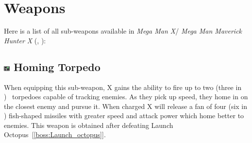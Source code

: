 \section{Weapons}\label{X1:sub_weapon}
Here is a list of all sub-weapons available in\textit{ Mega Man X}/ \textit{Mega Man Maverick Hunter X} (\cite{MHX:manual}, \cite{wiki:X_weapons}):

\subsection{\includegraphics[width=12px, height=10px]{figures/X1/weapons/Homig_T.jpg} Homing Torpedo}\label{Homing_torpedo}
When equipping this sub-weapon, X gains the ability to fire up to two (three in \mhx)~\cite{wiki:Homing_torpedo} torpedoes capable of tracking enemies. As they pick up speed, they home in on the closest enemy and pursue it. When charged X will release a fan of four (six in \mhx) fish-shaped missiles with greater speed and attack power which home better to enemies. This weapon is obtained after defeating Launch Octopus~[\ref{boss:Launch_octopus}].
